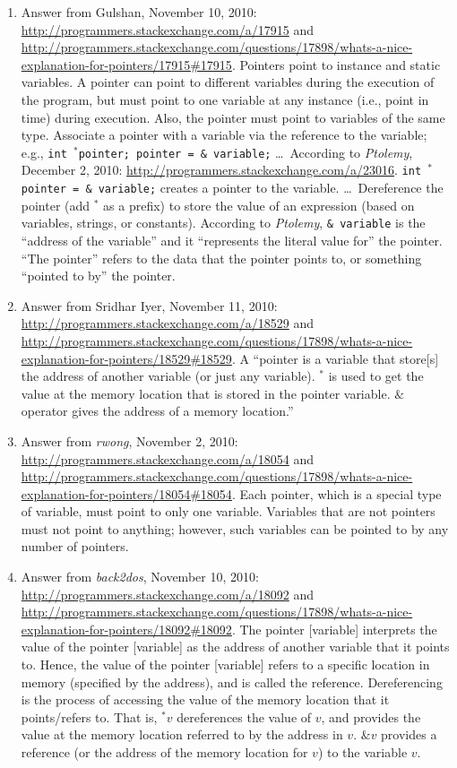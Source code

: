 \begin{enumerate}
\begin{enumerate}
	\item Answer from Gulshan, November 10, 2010: \url{http://programmers.stackexchange.com/a/17915} and \url{http://programmers.stackexchange.com/questions/17898/whats-a-nice-explanation-for-pointers/17915#17915}.  Pointers point to instance and static variables. A pointer can point to different variables during the execution of the program, but must point to one variable at any instance (i.e., point in time) during execution. Also, the pointer must point to variables of the same type. Associate a pointer with a variable via the reference to the variable; e.g., {\tt int $^{\ast}$pointer; pointer = \& variable;} \dots\ According to {\it Ptolemy}, December 2, 2010: \url{http://programmers.stackexchange.com/a/23016}. {\tt int $^{\ast}$pointer = \& variable;} creates a pointer to the variable. \dots\ Dereference the pointer (add $^{\ast}$ as a prefix) to store the value of an expression (based on variables, strings, or constants). According to {\it Ptolemy}, {\tt \& variable} is the ``address of the variable'' and it ``represents the literal value for'' the pointer. ``The pointer'' refers to the data that the pointer points to, or something ``pointed to by'' the pointer.
	\item Answer from Sridhar Iyer, November 11, 2010: \url{http://programmers.stackexchange.com/a/18529} and \url{http://programmers.stackexchange.com/questions/17898/whats-a-nice-explanation-for-pointers/18529#18529}. A ``pointer is a variable that store[s] the address of another variable (or just any variable). $^{\ast}$ is used to get the value at the memory location that is stored in the pointer variable. $\&$ operator gives the address of a memory location.''
	\item Answer from {\it rwong}, November 2, 2010: \url{http://programmers.stackexchange.com/a/18054} and \url{http://programmers.stackexchange.com/questions/17898/whats-a-nice-explanation-for-pointers/18054#18054}. Each pointer, which is a special type of variable, must point to only one variable. Variables that are not pointers must not point to anything; however, such variables can be pointed to by any number of pointers.
	\item Answer from {\it back2dos}, November 10, 2010: \url{http://programmers.stackexchange.com/a/18092} and \url{http://programmers.stackexchange.com/questions/17898/whats-a-nice-explanation-for-pointers/18092#18092}. The pointer [variable] interprets the value of the pointer [variable] as the address of another variable that it points to. Hence, the value of the pointer [variable] refers to a specific location in memory (specified by the address), and is called the reference. Dereferencing is the process of accessing the value of the memory location that it points/refers to. That is, $^{\ast}v$ dereferences the value of $v$, and provides the value at the memory location referred to by the address in $v$. $\&v$ provides a reference (or the address of the memory location for $v$) to the variable $v$. 

\end{enumerate}
\end{enumerate}
